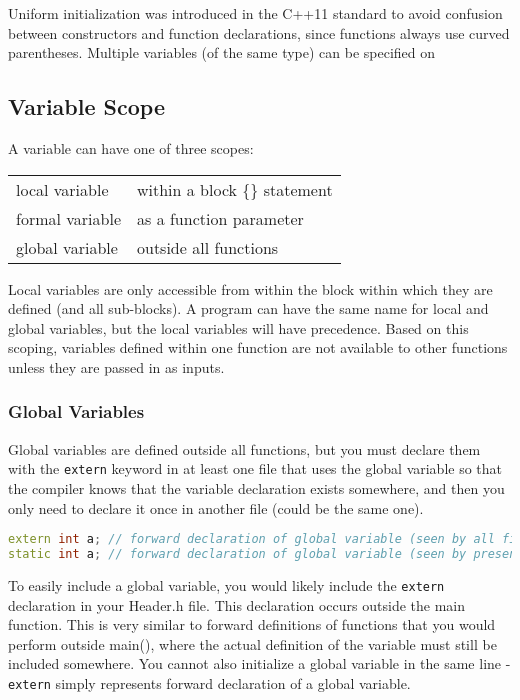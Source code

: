 \documentclass[10pt]{article}
\begin{document}
Uniform initialization was introduced in the C++11 standard to avoid confusion between constructors and function declarations, since functions always use curved parentheses. Multiple variables (of the same type) can be specified on 

\subsection{Variable Scope}

A variable can have one of three scopes:

\begin{center}
\begin{tabular}{l l}
local variable & within a block \{\} statement\\
formal variable & as a function parameter\\
global variable & outside all functions\\
\end{tabular}
\end{center}

Local variables are only accessible from within the block within which they are defined (and all sub-blocks). A program can have the same name for local and global variables, but the local variables will have precedence. Based on this scoping, variables defined within one function are not available to other functions unless they are passed in as inputs.

\subsubsection{Global Variables}

Global variables are defined outside all functions, but you must declare them with the \texttt{extern} keyword in at least one file that uses the global variable so that the compiler knows that the variable declaration exists somewhere, and then you only need to declare it once in another file (could be the same one). 

\begin{lstlisting}[language=C++]
extern int a; // forward declaration of global variable (seen by all files)
static int a; // forward declaration of global variable (seen by present file)
\end{lstlisting}

To easily include a global variable, you would likely include the \texttt{extern} declaration in your Header.h file. This declaration occurs outside the main function. This is very similar to forward definitions of functions that you would perform outside main(), where the actual definition of the variable must still be included somewhere. You cannot also initialize a global variable in the same line - \texttt{extern} simply represents forward declaration of a global variable.
\end{document}
